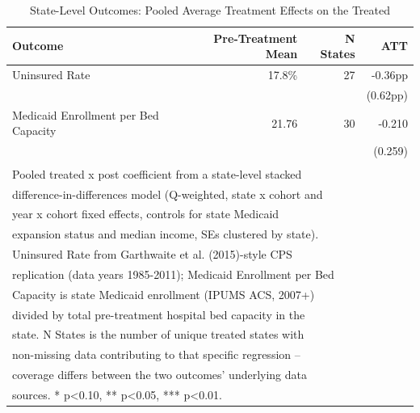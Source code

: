 \begin{table}[!h]
\centering
\caption{State-Level Outcomes: Pooled Average Treatment Effects on the Treated}
\centering
\begin{tabular}[t]{lrrr}
\toprule
Outcome & Pre-Treatment Mean & N States & ATT\\
\midrule
Uninsured Rate & 17.8\% & 27 & -0.36pp\\
 &  &  & (0.62pp)\\
Medicaid Enrollment per Bed Capacity & 21.76 & 30 & -0.210\\
 &  &  & (0.259)\\
\bottomrule
\multicolumn{4}{l}{\textsuperscript{} Pooled treated x post coefficient from a state-level stacked}\\
\multicolumn{4}{l}{difference-in-differences model (Q-weighted, state x cohort and}\\
\multicolumn{4}{l}{year x cohort fixed effects, controls for state Medicaid}\\
\multicolumn{4}{l}{expansion status and median income, SEs clustered by state).}\\
\multicolumn{4}{l}{Uninsured Rate from Garthwaite et al. (2015)-style CPS}\\
\multicolumn{4}{l}{replication (data years 1985-2011); Medicaid Enrollment per Bed}\\
\multicolumn{4}{l}{Capacity is state Medicaid enrollment (IPUMS ACS, 2007+)}\\
\multicolumn{4}{l}{divided by total pre-treatment hospital bed capacity in the}\\
\multicolumn{4}{l}{state. N States is the number of unique treated states with}\\
\multicolumn{4}{l}{non-missing data contributing to that specific regression --}\\
\multicolumn{4}{l}{coverage differs between the two outcomes' underlying data}\\
\multicolumn{4}{l}{sources. * p<0.10, ** p<0.05, *** p<0.01.}\\
\end{tabular}
\end{table}
